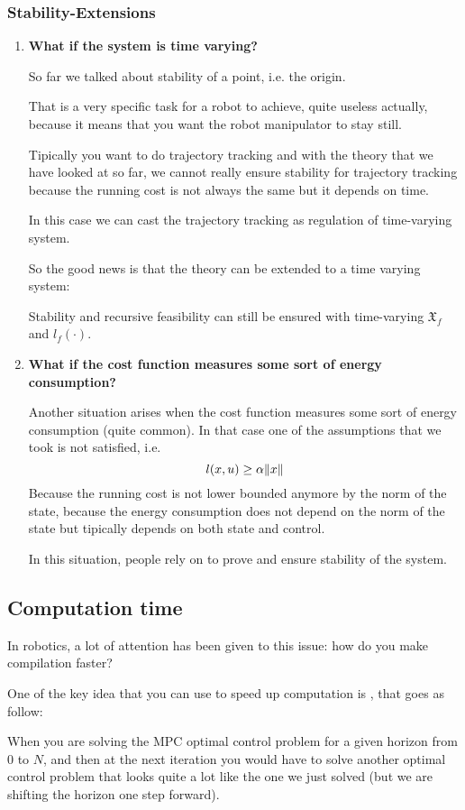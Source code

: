 \subsubsection{Stability-Extensions}
\begin{enumerate}
\item \textbf{What if the system is time varying?}

So far we talked about stability of a point, i.e. the origin.

That is a very specific task for a robot to achieve, quite useless actually, because it means that you want the robot manipulator to stay still.

Tipically you want to do trajectory tracking and with the theory that we have looked at so far, we cannot really ensure stability for trajectory tracking because the running cost is not always the same but it depends on time.

In this case we can cast the trajectory tracking as regulation of time-varying system.

So the good news is that the theory can be extended to a time varying system:

Stability and recursive feasibility can still be ensured with time-varying $\mathfrak{X}_f$ and $l_f(\cdot)$.
\item \textbf{What if the cost function measures some sort of energy consumption?}

Another situation arises when the cost function measures some sort of energy consumption (quite common). In that case one of the assumptions that we took is not satisfied, i.e.
\[l(x,u) \ge\alpha \lVert x\rVert\]
Because the running cost is not lower bounded anymore by the norm of the state, because the energy consumption does not depend on the norm of the state but tipically depends on both state and control.

In this situation, people rely on  to prove and ensure stability of the system.  
\end{enumerate}

\subsection{Computation time}
In robotics, a lot of attention has been given to this issue: how do you make compilation faster?

One of the key idea that you can use to speed up computation is , that goes as follow:

When you are solving the MPC optimal control problem for a given horizon from $0$ to $N$, and then at the next iteration you would have to solve another optimal control problem that looks quite a lot like the one we just solved (but we are shifting the horizon one step forward).

